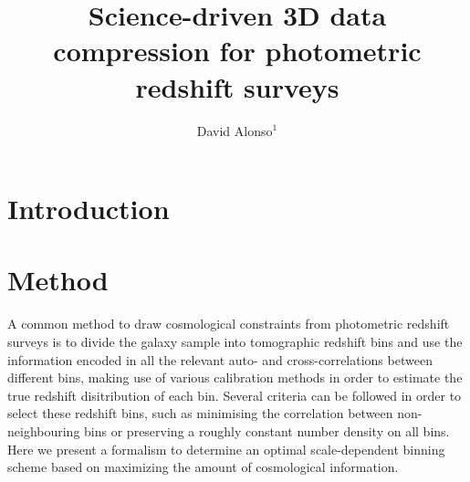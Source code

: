 \documentclass[twocolumn,amsfont,amssymb,amsmath, showpacs,balancelastpage, nofootinbib]{revtex4-1}
\begin{document}
\title{Science-driven 3D data compression for photometric redshift surveys}
\author{David Alonso$^1$}

\begin{abstract}
 \lipsum[0]
\end{abstract}

\maketitle

\section{Introduction}\label{sec:intro}
\lipsum[1]

\section{Method}\label{sec:method}
  A common method to draw cosmological constraints from photometric redshift surveys is to divide the galaxy sample into tomographic redshift bins and use the information encoded in all the relevant auto- and cross-correlations between different bins, making use of various calibration methods in order to estimate the true redshift disitribution of each bin. Several criteria can be followed in order to select these redshift bins, such as minimising the correlation between non-neighbouring bins or preserving a roughly constant number density on all bins. Here we present a formalism to determine an optimal scale-dependent binning scheme based on maximizing the amount of cosmological information.
\end{document}
